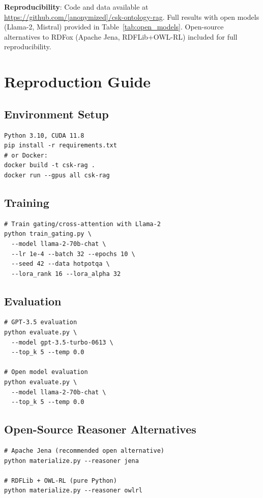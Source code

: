 \documentclass[10pt,twocolumn]{article}
\begin{document}
\textbf{Reproducibility}: Code and data available at \url{https://github.com/[anonymized]/csk-ontology-rag}. Full results with open models (Llama-2, Mistral) provided in Table~\ref{tab:open_models}. Open-source alternatives to RDFox (Apache Jena, RDFLib+OWL-RL) included for full reproducibility.




\appendix

\section{Reproduction Guide}
\label{app:repro}

\subsection{Environment Setup}
\begin{verbatim}
Python 3.10, CUDA 11.8
pip install -r requirements.txt
# or Docker:
docker build -t csk-rag .
docker run --gpus all csk-rag
\end{verbatim}

\subsection{Training}
\begin{verbatim}
# Train gating/cross-attention with Llama-2
python train_gating.py \
  --model llama-2-70b-chat \
  --lr 1e-4 --batch 32 --epochs 10 \
  --seed 42 --data hotpotqa \
  --lora_rank 16 --lora_alpha 32
\end{verbatim}

\subsection{Evaluation}
\begin{verbatim}
# GPT-3.5 evaluation
python evaluate.py \
  --model gpt-3.5-turbo-0613 \
  --top_k 5 --temp 0.0

# Open model evaluation
python evaluate.py \
  --model llama-2-70b-chat \
  --top_k 5 --temp 0.0
\end{verbatim}

\subsection{Open-Source Reasoner Alternatives}
\begin{verbatim}
# Apache Jena (recommended open alternative)
python materialize.py --reasoner jena

# RDFLib + OWL-RL (pure Python)
python materialize.py --reasoner owlrl
\end{verbatim}
\end{document}
